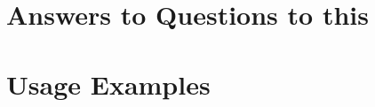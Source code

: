 \chapter{Answers to Questions to this \documentType}

\cleardoublepage

\chapter{Usage Examples} 
\label{ch:usage_examples}

\cleardoublepage

\ifPubList
	
\fi
\cleardoublepage

\ifVita
	
\fi
\cleardoublepage

\ifIndex
	\printindex
\fi
\cleardoublepage

